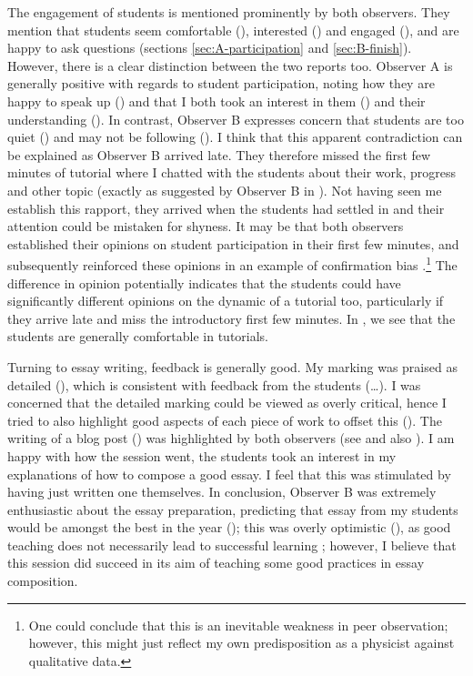 The engagement of students is mentioned prominently by both observers. They mention that students seem comfortable (), interested () and engaged (), and are happy to ask questions (sections \ref{sec:A-participation} and \ref{sec:B-finish}). However, there is a clear distinction between the two reports too. Observer A is generally positive with regards to student participation, noting how they are happy to speak up () and that I both took an interest in them () and their understanding (). In contrast, Observer B expresses concern that students are too quiet () and may not be following (). I think that this apparent contradiction can be explained as Observer B arrived late. They therefore missed the first few minutes of tutorial where I chatted with the students about their work, progress and other topic (exactly as suggested by Observer B in ). Not having seen me establish this rapport, they arrived when the students had settled in and their attention could be mistaken for shyness. It may be that both observers established their opinions on student participation in their first few minutes, and subsequently reinforced these opinions in an example of confirmation bias \citep{Ross1975,Lord1979}.\footnote{One could conclude that this is an inevitable weakness in peer observation; however, this might just reflect my own predisposition as a physicist against qualitative data.} The difference in opinion potentially indicates that the students could have significantly different opinions on the dynamic of a tutorial too, particularly if they arrive late and miss the introductory first few minutes. In , we see that the students are generally comfortable in tutorials.

Turning to essay writing, feedback is generally good. My marking was praised as detailed (), which is consistent with feedback from the students (\ldots). I was concerned that the detailed marking could be viewed as overly critical, hence I tried to also highlight good aspects of each piece of work to offset this  (). The writing of a blog post () was highlighted by both observers (see  and also ). I am happy with how the session went, the students took an interest in my explanations of how to compose a good essay. I feel that this was stimulated by having just written one themselves. In conclusion, Observer B was extremely enthusiastic about the essay preparation, predicting that essay from my students would be amongst the best in the year (); this was overly optimistic (), as good teaching does not necessarily lead to successful learning \citep[chapter 5]{Ramsden1992}; however, I believe that this session did succeed in its aim of teaching some good practices in essay composition.


